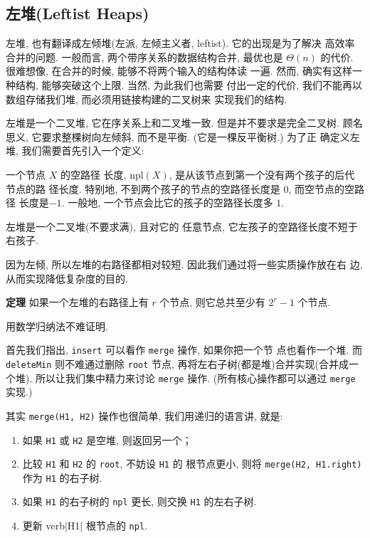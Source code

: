 \documentclass[a4paper]{ctexart}
\theoremstyle{definition}
\theoremstyle{definition}
\begin{document}
\subsection{左堆(Leftist Heaps)}
左堆, 也有翻译成左倾堆(左派, 左倾主义者, leftist). 它的出现是为了解决
高效率合并的问题. 一般而言, 两个带序关系的数据结构合并, 最优也是
$\Theta(n)$ 的代价. 很难想像, 在合并的时候, 能够不将两个输入的结构体读
一遍. 然而, 确实有这样一种结构, 能够突破这个上限. 当然, 为此我们也需要
付出一定的代价, 我们不能再以数组存储我们堆, 而必须用链接构建的二叉树来
实现我们的结构.

左堆是一个二叉堆, 它在序关系上和二叉堆一致. 但是并不要求是完全二叉树.
顾名思义, 它要求整棵树向左倾斜, 而不是平衡. (它是一棵反平衡树.) 为了正
确定义左堆, 我们需要首先引入一个定义:

 一个节点 $X$ 的空路径
长度, $\mathrm{npl}(X)$, 是从该节点到第一个没有两个孩子的后代节点的路
径长度. 特别地, 不到两个孩子的节点的空路径长度是 $0$, 而空节点的空路径
长度是$-1$. 一般地, 一个节点会比它的孩子的空路径长度多 $1$.

 左堆是一个二叉堆(不要求满), 且对它的
任意节点, 它左孩子的空路径长度不短于右孩子.

因为左倾, 所以左堆的右路径都相对较短. 因此我们通过将一些实质操作放在右
边, 从而实现降低复杂度的目的.

{\bf 定理} 如果一个左堆的右路径上有 $r$ 个节点, 则它总共至少有 $2^r -
1$ 个节点.

用数学归纳法不难证明. 


首先我们指出, \verb|insert| 可以看作 \verb|merge| 操作, 如果你把一个节
点也看作一个堆. 而 \verb|deleteMin| 则不难通过删除 \verb|root| 节点,
再将左右子树(都是堆)合并实现(合并成一个堆). 所以让我们集中精力来讨论
\verb|merge| 操作. (所有核心操作都可以通过 \verb|merge| 实现.)

其实 \verb|merge(H1, H2)| 操作也很简单, 我们用递归的语言讲, 就是:

\begin{enumerate}
\item 如果 \verb|H1| 或 \verb|H2| 是空堆, 则返回另一个；
\item 比较 \verb|H1| 和 \verb|H2| 的 \verb|root|, 不妨设 \verb|H1| 的
  根节点更小, 则将 \verb|merge(H2, H1.right)| 作为 \verb|H1| 的右子树.
\item 如果 \verb|H1| 的右子树的 \verb|npl| 更长, 则交换 \verb|H1| 的左右子树.
\item 更新 verb|H1| 根节点的 \verb|npl|.
\end{enumerate}
\end{document}
